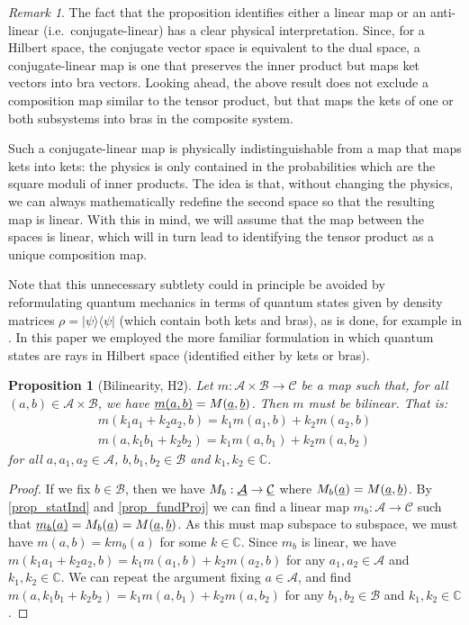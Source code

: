 \documentclass[aps,prl,amsmath,amssymb,twocolumn,nofootinbib]{revtex4}
\theoremstyle{plain}
\newtheorem{prop}[thrm]{Proposition}
\theoremstyle{definition}
\theoremstyle{remark}
\newtheorem*{remark}{Remark}
\newcommand{\pj}[1] {\underbar{$#1$}}
\def\>{\rangle}
\def\<{\langle}
\begin{document}
	\begin{remark}
		The fact that the proposition identifies either a linear map or an anti-linear (i.e.~conjugate-linear)  has a clear physical interpretation. Since, for a Hilbert space, the conjugate vector space is equivalent to the dual space, a conjugate-linear map is one that preserves the inner product but maps ket vectors into bra vectors. Looking ahead, the above result does not exclude a composition map similar to the tensor product, but that maps the kets of one or both subsystems into bras in the composite system.
		
		Such a conjugate-linear map is physically indistinguishable from a map that maps kets into kets: the physics is only contained in the probabilities which are the square moduli of inner products. The idea is that, without changing the physics, we can always mathematically redefine the second space so that the resulting map is linear. With this in mind, we will assume that the map between the spaces is linear, which will in turn lead to identifying the tensor product as a unique composition map.
		
		Note that this unnecessary subtlety could in principle be avoided by
		reformulating quantum mechanics in terms of quantum states given by
		density matrices $\rho=|\psi\>\<\psi|$ (which contain both  kets and
		bras), as is done, for example in \cite{ozawa,holevo}. In this paper
		we employed the more familiar formulation in which quantum states are
		rays in Hilbert space (identified either by kets or bras).
	\end{remark}
	
	\begin{prop}[Bilinearity, H2]\label{prop_bilinearity}
		Let $m : \mathcal{A} \times \mathcal{B} \to \mathcal{C}$ be a map such that, for all $(a,b) \in \mathcal{A} \times \mathcal{B}$, we have $\pj{m(a,b)} = M(\pj{a}, \pj{b})$. Then $m$ must be bilinear. That is:
		\begin{align}
		m(k_1a_1 + k_2a_2, b)=k_1m(a_1, b) + k_2m(a_2, b) \\
		m(a, k_1b_1 + k_2b_2)=k_1m(a, b_1) + k_2m(a, b_2)
		\end{align}
		for all $a, a_1, a_2 \in \mathcal{A}$, $b, b_1, b_2 \in \mathcal{B}$ and $k_1, k_2 \in \mathbb{C}$.
	\end{prop}
	
	\begin{proof}
		If we fix $b \in \mathcal{B}$, then we have $M_b : \pj{\mathcal{A}} \to \pj{\mathcal{C}}$ where $M_b(\pj{a}) = M(\pj{a}, \pj{b})$. By \ref{prop_statInd} and \ref{prop_fundProj} we can find a linear map $m_b : \mathcal{A} \to \mathcal{C}$ such that $\pj{m_b(a)} = M_b(\pj{a}) = M(\pj{a}, \pj{b})$. As this must map subspace to subspace, we must have $m(a, b) = k m_b(a)$ for some $k \in \mathbb{C}$. Since $m_b$ is linear, we have $m(k_1a_1 + k_2a_2, b)=k_1m(a_1, b) + k_2m(a_2, b)$ for any $a_1, a_2 \in \mathcal{A}$ and $k_1, k_2 \in \mathbb{C}$. We can repeat the argument fixing $a \in \mathcal{A}$, and find $m(a, k_1b_1 + k_2b_2)=k_1m(a, b_1) + k_2m(a, b_2)$ for any $b_1, b_2 \in \mathcal{B}$ and $k_1, k_2 \in \mathbb{C}$.
	\end{proof}
	
\end{document}
